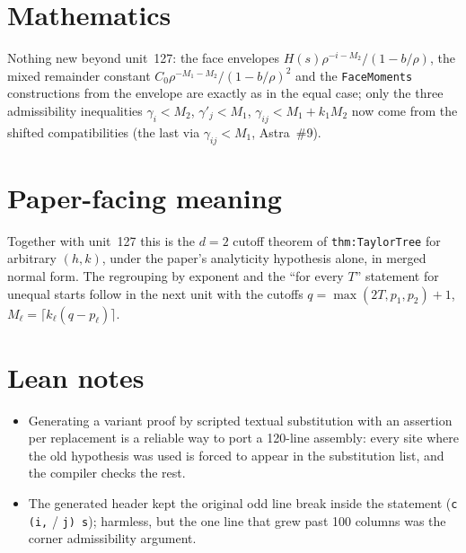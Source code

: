 \documentclass[11pt]{article}
\begin{document}
\section{Mathematics}

Nothing new beyond unit~127: the face envelopes $H(s)\rho^{-i-M_2}/(1-b/\rho)$, the mixed
remainder constant $C_0\rho^{-M_1-M_2}/(1-b/\rho)^2$ and the \texttt{FaceMoments} constructions
from the envelope are exactly as in the equal case; only the three admissibility inequalities
$\gamma_i<M_2$, $\gamma'_j<M_1$, $\gamma_{ij}<M_1+k_1M_2$ now come from the shifted compatibilities
(the last via $\gamma_{ij}<M_1$, Astra~\#9).

\section{Paper-facing meaning}

Together with unit~127 this is the $d=2$ cutoff theorem of \texttt{thm:TaylorTree} for arbitrary
$(h,k)$, under the paper's analyticity hypothesis alone, in merged normal form. The regrouping by
exponent and the ``for every $T$'' statement for unequal starts follow in the next unit with the
cutoffs $q=\max(2T,p_1,p_2)+1$, $M_\ell=\lceil k_\ell(q-p_\ell)\rceil$.

\section{Lean notes}

\begin{itemize}
\item Generating a variant proof by scripted textual substitution with an assertion per
replacement is a reliable way to port a 120-line assembly: every site where the old hypothesis was
used is forced to appear in the substitution list, and the compiler checks the rest.
\item The generated header kept the original odd line break inside the statement
(\texttt{c (i,} / \texttt{j) s}); harmless, but the one line that grew past 100 columns was the
corner admissibility argument.
\end{itemize}
\end{document}
